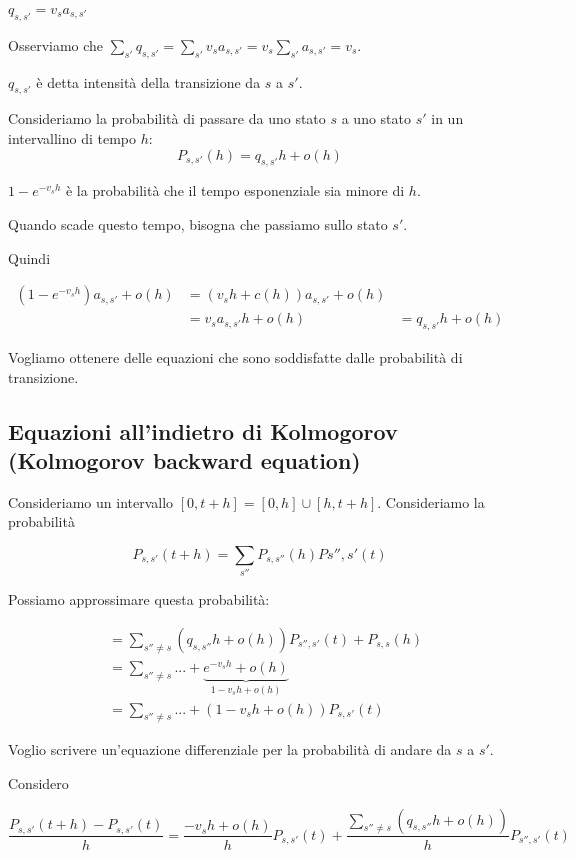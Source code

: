 \documentclass[a4paper,12pt]{book}
\begin{document}
$ q_{s,s'} = v_sa_{s,s'} $

Osserviamo che $\sum_{s'} q_{s,s'} = \sum_{s'} v_s a_{s,s'} = v_s \sum_{s'} a_{s,s'} = v_s$.

$ q_{s,s'} $ è detta intensità della transizione da $ s $ a $ s' $.

Consideriamo la probabilità di passare da uno stato $ s $ a uno stato $ s' $ in un intervallino di tempo $ h $:
$$ P_{s,s'}(h) = q_{s,s'}h + o(h) $$

$ 1 - e^{-v_s h} $ è la probabilità che il tempo esponenziale sia minore di $ h $. 

Quando scade questo tempo, bisogna che passiamo sullo stato $ s' $.

Quindi 

\begin{align*}
	(1 - e^{-v_s h})a_{s,s'} + o(h) & = (v_s h + c(h)) a_{s,s'} + o(h) \\
	& = v_s a_{s,s'} h + o(h) & = q_{s,s'} h + o(h)
\end{align*}

Vogliamo ottenere delle equazioni che sono soddisfatte dalle probabilità di transizione.

\subsection{Equazioni all'indietro di Kolmogorov (Kolmogorov backward equation)}

Consideriamo un intervallo $ [0, t+h] = [0, h] \cup [h, t+h] $. 
Consideriamo la probabilità

$$ P_{s,s'} (t+h) = \sum_{s''} P_{s,s''}(h)P{s'', s'}(t) $$

Possiamo approssimare questa probabilità:

\begin{align*}
	& = \sum_{s'' \ne s} (q_{s,s''}h + o(h))P_{s'',s'}(t) + P_{s,s}(h) \\
	& = \sum_{s'' \ne s} ... + \underbrace{e^{-v_s h} + o(h)}_{1 - v_s h + o(h)}\\ 
	& = \sum_{s'' \ne s} ... + (1 - v_s h + o(h))P_{s,s'}(t)
\end{align*}

Voglio scrivere un'equazione differenziale per la probabilità di andare da $ s $ a $ s' $.

Considero 

$$ \frac{P_{s,s'}(t+h) - P_{s,s'}(t)}{h} = \frac{-v_s h + o(h)}{h} P_{s,s'}(t) + \frac{\sum_{s'' \ne s} (q_{s,s''} h + o(h)) }{h} P_{s'',s'}(t) $$
\end{document}
